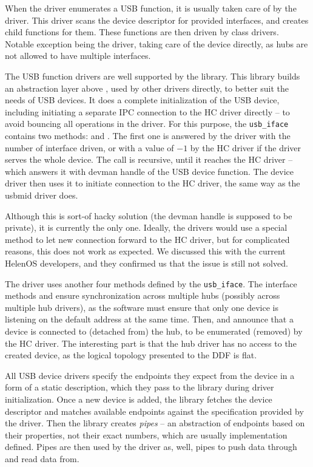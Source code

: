 When the driver enumerates a USB function, it is usually taken care of by the
 driver. This driver scans the device descriptor for provided
interfaces, and creates child functions for them. These functions are then
driven by class drivers. Notable exception being the  driver,
taking care of the device directly, as hubs are not allowed to have multiple
interfaces.

The USB function drivers are well supported by the  library.
This library builds an abstraction layer above , used by other
drivers directly, to better suit the needs of USB devices. It does a complete
initialization of the USB device, including initiating a separate IPC
connection to the HC driver directly -- to avoid bouncing all operations in the
 driver. For this purpose, the \texttt{usb\_iface} contains two
methods:  and . The first one is
answered by the  driver with the number of interface driven, or
with a value of $-1$ by the HC driver if the driver serves the whole device.
The  call is recursive, until it reaches the HC
driver -- which answers it with devman handle of the USB device function. The
device driver then uses it to initiate connection to the HC driver, the same
way as the usbmid driver does.

Although this is sort-of hacky solution (the devman handle is supposed to be
private), it is currently the only one. Ideally, the drivers would use
a special method to let new connection forward to the HC driver, but for
complicated reasons, this does not work as expected. We discussed this with the
current HelenOS developers, and they confirmed us that the issue is still not
solved.

The  driver uses another four methods defined by the
\texttt{usb\_iface}. The interface methods  and
 ensure synchronization across multiple hubs
(possibly across multiple hub drivers), as the software must ensure that only one
device is listening on the default address at the same time. Then,
 and  announce that a device is
connected to (detached from) the hub, to be enumerated (removed) by the HC
driver. The interesting part is that the hub driver has no access to the
created device, as the logical topology presented to the DDF is flat.

All USB device drivers specify the endpoints they expect from the device in
a form of a static description, which they pass to the  library
during driver initialization. Once a new device is added, the library
fetches the device descriptor and matches available endpoints against the
specification provided by the driver. Then the library creates \emph{pipes} --
an abstraction of endpoints based on their properties, not their exact numbers,
which are usually implementation defined. Pipes are then used by the driver
as, well, pipes to push data through and read data from.

